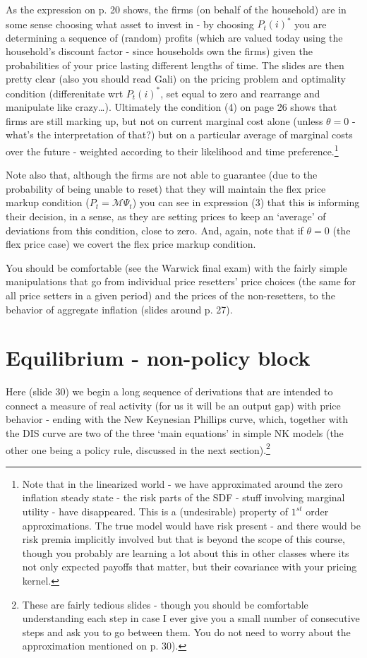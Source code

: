 \documentclass[authoryear,11pt]{elsarticle}
\begin{document}
As the expression on p. 20 shows, the firms (on behalf of the household) are in some sense choosing what asset to invest in - by choosing $P_{t}(i)^{\ast}$ you are determining a sequence of (random) profits (which are valued today using the household's discount factor - since households own the firms) given the probabilities of your price lasting different lengths of time. The slides are then pretty clear (also you should read Gali) on the pricing problem and optimality condition (differenitate wrt $P_{t}(i)^{\ast}$, set equal to zero and rearrange and manipulate like crazy\ldots). Ultimately the condition (4) on page 26 shows that firms are still marking up, but not on current marginal cost alone (unless $\theta = 0$ - what's the interpretation of that?) but on a particular average of marginal costs over the future - weighted according to their likelihood and time preference.\footnote{Note that in the linearized world - we have approximated around the zero inflation steady state - the risk parts of the SDF - stuff involving marginal utility - have disappeared. This is a (undesirable) property of $1^{st}$ order approximations. The true model would have risk present - and there would be risk premia implicitly involved but that is beyond the scope of this course, though you probably are learning a lot about this in other classes where its not only expected payoffs that matter, but their covariance with your pricing kernel.}

Note also that, although the firms are not able to guarantee (due to the probability of being unable to reset) that they will maintain the flex price markup condition ($P_{t} = \mathcal{M}\Psi_{t}$) you can see in expression (3) that this is informing their decision, in a sense, as they are setting prices to keep an `average' of deviations from this condition, close to zero. And, again, note that if $\theta=0$ (the flex price case) we covert the flex price markup condition.

You should be comfortable (see the Warwick final exam) with the fairly simple manipulations that go from individual price resetters' price choices (the same for all price setters in a given period) and the prices of the non-resetters, to the behavior of aggregate inflation (slides around p. 27).

\section{Equilibrium - non-policy block}
Here (slide 30) we begin a long sequence of derivations that are intended to connect a measure of real activity (for us it will be an output gap) with price behavior - ending with the New Keynesian Phillips curve, which, together with the DIS curve are two of the three `main equations' in simple NK models (the other one being a policy rule, discussed in the next section).\footnote{These are fairly tedious slides - though you should be comfortable understanding each step in case I ever give you a small number of consecutive steps and ask you to go  between them. You do not need to worry about the approximation mentioned on p. 30).}
\end{document}
